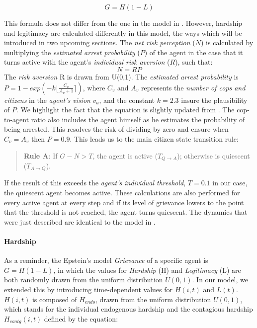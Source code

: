 \documentclass[10pt]{article}
\begin{document}
    \begin{equation}
        G = H(1 - L)
    \end{equation}


    This formula does not differ from the one in the model in \cite{epstein2002}. However, hardship and legitimacy are calculated differently in this model, the ways which will be introduced in two upcoming sections. The \emph{net risk perception} ($N$) is calculated by multiplying the \emph{estimated arrest probability} ($P$) of the agent in the case that it turns active with the agent's \emph{individual risk aversion} ($R$), such that:
    \begin{equation}
        N = RP
    \end{equation}
    The \emph{risk aversion} R is drawn from U(0,1). The \emph{estimated arrest probability} is $P = 1 - exp( - k \lfloor\frac{C_v}{A_v + 1}\rceil)$, where $C_v$ and $A_v$ represents the \emph{number of cops and citizens} in the \emph{agent's vision} $v_a$, and the constant $k = 2.3$ insure the plausibility of $P$. We highlight the fact that the equation is slightly updated from \citet{epstein2002}. The cop-to-agent ratio also includes the agent himself as he estimates the probability of being arrested. This resolves the risk of dividing by zero and ensure when $C_v = A_v$ then $P = 0.9$. This leads us to the main citizen state transition rule:

    \begin{quote}
        \textbf{Rule A}: If  $G - N > T$, the agent is active ($T_{Q \rightarrow A}$); otherwise is quiescent ($T_{A \rightarrow Q}$).
    \end{quote}

    If the result of this exceeds the \emph{agent's individual threshold}, $T = 0.1$ in our case, the quiescent agent becomes active. These calculations are also performed for every active agent at every step and if its level of grievance lowers to the point that the threshold is not reached, the agent turns quiescent. The dynamics that were just described are identical to the model in \cite{epstein2002}.

    \paragraph{Hardship}
    As a reminder, the Epstein's model \emph{Grievance} of a specific agent is $G = H(1 - L)$, in which the values for \emph{Hardship} (H) and \emph{Legitimacy} (L) are both randomly drawn from the uniform distribution $U(0,1)$. In our model, we extended this by introducing time-dependent values for $H(i,t)$ and $L(t)$. $H(i,t)$ is composed of $H_{endo}$, drawn from the uniform distribution $U(0, 1)$, which stands for the individual endogenous hardship and the contagious hardship $H_{contg}(i,t)$ defined by the equation:
\end{document}
